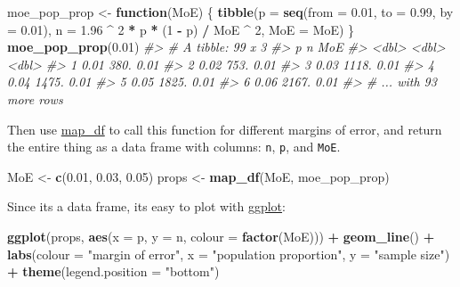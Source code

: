 \documentclass[]{book}
\newenvironment{Shaded}{\begin{snugshade}}{\end{snugshade}}
\newcommand{\KeywordTok}[1]{\textcolor[rgb]{0.13,0.29,0.53}{\textbf{#1}}}
\newcommand{\DataTypeTok}[1]{\textcolor[rgb]{0.13,0.29,0.53}{#1}}
\newcommand{\DecValTok}[1]{\textcolor[rgb]{0.00,0.00,0.81}{#1}}
\newcommand{\FloatTok}[1]{\textcolor[rgb]{0.00,0.00,0.81}{#1}}
\newcommand{\StringTok}[1]{\textcolor[rgb]{0.31,0.60,0.02}{#1}}
\newcommand{\CommentTok}[1]{\textcolor[rgb]{0.56,0.35,0.01}{\textit{#1}}}
\newcommand{\ControlFlowTok}[1]{\textcolor[rgb]{0.13,0.29,0.53}{\textbf{#1}}}
\newcommand{\OperatorTok}[1]{\textcolor[rgb]{0.81,0.36,0.00}{\textbf{#1}}}
\newcommand{\NormalTok}[1]{#1}
\theoremstyle{definition}
\theoremstyle{definition}
\theoremstyle{definition}
\theoremstyle{remark}
\begin{document}
\begin{Shaded}
\begin{Highlighting}[]
\NormalTok{moe_pop_prop <-}\StringTok{ }\ControlFlowTok{function}\NormalTok{(MoE) \{}
  \KeywordTok{tibble}\NormalTok{(}\DataTypeTok{p =} \KeywordTok{seq}\NormalTok{(}\DataTypeTok{from =} \FloatTok{0.01}\NormalTok{, }\DataTypeTok{to =} \FloatTok{0.99}\NormalTok{, }\DataTypeTok{by =} \FloatTok{0.01}\NormalTok{),}
         \DataTypeTok{n =} \FloatTok{1.96} \OperatorTok{^}\StringTok{ }\DecValTok{2} \OperatorTok{*}\StringTok{ }\NormalTok{p }\OperatorTok{*}\StringTok{ }\NormalTok{(}\DecValTok{1} \OperatorTok{-}\StringTok{ }\NormalTok{p) }\OperatorTok{/}\StringTok{ }\NormalTok{MoE }\OperatorTok{^}\StringTok{ }\DecValTok{2}\NormalTok{,}
         \DataTypeTok{MoE =}\NormalTok{ MoE)}
\NormalTok{\}}
\KeywordTok{moe_pop_prop}\NormalTok{(}\FloatTok{0.01}\NormalTok{)}
\CommentTok{#> # A tibble: 99 x 3}
\CommentTok{#>       p     n   MoE}
\CommentTok{#>   <dbl> <dbl> <dbl>}
\CommentTok{#> 1  0.01  380.  0.01}
\CommentTok{#> 2  0.02  753.  0.01}
\CommentTok{#> 3  0.03 1118.  0.01}
\CommentTok{#> 4  0.04 1475.  0.01}
\CommentTok{#> 5  0.05 1825.  0.01}
\CommentTok{#> 6  0.06 2167.  0.01}
\CommentTok{#> # ... with 93 more rows}
\end{Highlighting}
\end{Shaded}

Then use
\href{https://www.rdocumentation.org/packages/purrr/topics/map_df}{map\_df}
to call this function for different margins of error, and return the
entire thing as a data frame with columns: \texttt{n}, \texttt{p}, and
\texttt{MoE}.

\begin{Shaded}
\begin{Highlighting}[]
\NormalTok{MoE <-}\StringTok{ }\KeywordTok{c}\NormalTok{(}\FloatTok{0.01}\NormalTok{, }\FloatTok{0.03}\NormalTok{, }\FloatTok{0.05}\NormalTok{)}
\NormalTok{props <-}\StringTok{ }\KeywordTok{map_df}\NormalTok{(MoE, moe_pop_prop)}
\end{Highlighting}
\end{Shaded}

Since its a data frame, its easy to plot with
\href{https://www.rdocumentation.org/packages/ggplot2/topics/ggplot}{ggplot}:

\begin{Shaded}
\begin{Highlighting}[]
\KeywordTok{ggplot}\NormalTok{(props, }\KeywordTok{aes}\NormalTok{(}\DataTypeTok{x =}\NormalTok{ p, }\DataTypeTok{y =}\NormalTok{ n, }\DataTypeTok{colour =} \KeywordTok{factor}\NormalTok{(MoE))) }\OperatorTok{+}
\StringTok{  }\KeywordTok{geom_line}\NormalTok{() }\OperatorTok{+}
\StringTok{  }\KeywordTok{labs}\NormalTok{(}\DataTypeTok{colour =} \StringTok{"margin of error"}\NormalTok{,}
       \DataTypeTok{x =} \StringTok{"population proportion"}\NormalTok{,}
       \DataTypeTok{y =} \StringTok{"sample size"}\NormalTok{) }\OperatorTok{+}
\StringTok{  }\KeywordTok{theme}\NormalTok{(}\DataTypeTok{legend.position =} \StringTok{"bottom"}\NormalTok{)}
\end{Highlighting}
\end{Shaded}
\end{document}
